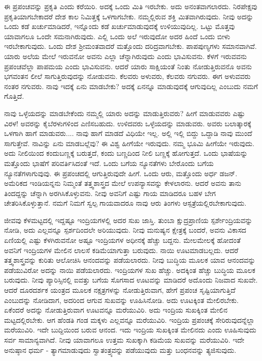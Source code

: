 ಈ ಪ್ರಪಂಚವನ್ನು ಪ್ರಕೃತಿ ಎಂದು ಕರೆಯಿರಿ. ಅದಕ್ಕೆ ಒಂದು ಮಿತಿ ಇರಬೇಕು. ಅದು ಅನಂತವಾಗಲಾರದು. ನಿರಪೇಕ್ಷವು ಪ್ರಕೃತಿಯಾಗಬೇಕಾದರೆ ದೇಶ ಕಾಲ ನಿಮಿತ್ತಕ್ಕೆ ಒಳಗಾಗಬೇಕು. ನಮ್ಮಲ್ಲಿರುವ ಶಕ್ತಿ ಮಿತವಾಗಿರುವುದು. ನೀವು ಅದನ್ನು ಒಂದು ಕಡೆ ಖರ್ಚುಮಾಡಿದರೆ, ಇನ್ನೊಂದು ಕಡೆ ಖರ್ಚುಮಾಡುವುದಕ್ಕೆ ಉಳಿಯುವುದಿಲ್ಲ. ಒಟ್ಟು ಮೊತ್ತವು ಯಾವಾಗಲೂ ಒಂದೇ ಸಮನಾಗಿರುವುದು. ಎಲ್ಲಿ ಒಂದು ಅಲೆ ಇರುವುದೋ ಅದರ ಹಿಂದೆ ಒಂದು ಬೀಳು ಇರಬೇಕಾಗುವುದು. ಒಂದು ದೇಶ ಶ‍್ರೀಮಂತವಾದರೆ ಮತ್ತೊಂದು ದರಿದ್ರವಾಗಬೇಕು. ಪಾಪಪುಣ್ಯಗಳು ಸಮಾನವಾಗಿವೆ. ಯಾರು ಅಲೆಯ ಮೇಲೆ ಇರುವನೋ ಅವನು ಎಲ್ಲಾ ಚೆನ್ನಾಗಿರುವುದು ಎಂದು ಭಾವಿಸುವನು. ಕೆಳಗೆ ಇರುವವನು ಪ್ರಪಂಚವೆಲ್ಲಾ ಪಾಪಮಯ ಎಂದು ಭಾವಿಸುವನು. ಆದರೆ ಯಾರು ಸಾಕ್ಷಿಯಂತೆ ನಿಂತು ನೋಡುತ್ತಿರುವನೊ ಅವನು ಭಗವಂತನ ಲೀಲೆ ಸಾಗುತ್ತಿರುವುದನ್ನು ನೋಡುವನು. ಕೆಲವರು ಅಳುವರು, ಕೆಲವರು ನಗುವರು. ಈಗ ಅಳುವವರು ನಂತರ ನಗುವರು. ನಾವು ಇದಕ್ಕೆ ಏನು ಮಾಡಬೇಕು? ಅದಕ್ಕೆ ಏನನ್ನೂ ಮಾಡುವುದಕ್ಕೆ ಆಗುವುದಿಲ್ಲ ಎಂಬುದು ನಮಗೆ ಗೊತ್ತಿದೆ.

ನಾವು ಒಳ್ಳೆಯದನ್ನು ಮಾಡಬೇಕೆಂದು ನಮ್ಮಲ್ಲಿ ಯಾರು ಅದನ್ನು ಮಾಡುತ್ತಿರುವರು? ಹೀಗೆ ಮಾಡುವವರು ಎಷ್ಟು ವಿರಳ! ಅವರನ್ನು ಕೈಬೆರಳುಗಳಿಂದ ಎಣಿಸಬಹುದು. ಉಳಿದವರು ಒಳ್ಳೆಯದನ್ನು ಮಾಡುವರು. ಅವರು ಬಲಾತ್ಕಾರಕ್ಕೆ ಒಳಗಾಗಿ ಹಾಗೆ ಮಾಡುವರು.... ನಾವು ಹಾಗೆ ಮಾಡದೆ ವಿಧಿಯೇ ಇಲ್ಲ. ಅಲ್ಲಿ ಇಲ್ಲಿ ಬಿದ್ದು ಒದ್ದಾಡಿ ನಾವು ಮುಂದೆ ಸಾಗುತ್ತೇವೆ. ನಾವಿನ್ನು ಏನು ಮಾಡಬಲ್ಲೆವು? ಈ ವಿಶ್ವ ಹೀಗೆಯೇ ಇರುವುದು. ನಮ್ಮ ಭೂಮಿ ಹೀಗೆಯೇ ಇರುವುದು. ಅದು ನೀಲಿಯಿಂದ ಕಂದುಬಣ್ಣಕ್ಕೆ ಬರುತ್ತದೆ, ಕಂದು ಬಣ್ಣದಿಂದ ನೀಲಿ ಬಣ್ಣಕ್ಕೆ ಹೋಗುತ್ತದೆ. ಒಂದು ಭಾಷೆಯನ್ನು ಮತ್ತೊಂದು ಭಾಷೆಗೆ ಪರಿವರ್ತಿಸಿದಂತೆ ಇದೆ. ಒಂದು ಬಗೆಯ ನ್ಯೂನತೆಗಳು ಬೇರೊಂದು ಬಗೆಯ ನ್ಯೂನತೆಗಳಾಗುವುವು. ಈ ಪ್ರಪಂಚದಲ್ಲಿ ಆಗುತ್ತಿರುವುದೇ ಹೀಗೆ. ಒಂದು ಆರು, ಮತ್ತೊಂದು ಅರ್ಧ ಡಜನ್. ಅಮೆರಿಕದ ಇಂಡಿಯನ್ನನು ನಿಮ್ಮಂತೆ ತತ್ತ್ವಶಾಸ್ತ್ರದ ಮೇಲೆ ಉಪನ್ಯಾಸವನ್ನು ಕೇಳಲಾರನು. ಆದರೆ ಅವನು ತಾನು ತಿಂದದ್ದನ್ನು ಚೆನ್ನಾಗಿ ಅರಗಿಸಿಕೊಳ್ಳುವನು. ನೀವು ಅವನಿಗೆ ಎಷ್ಟು ಗಾಯ ಮಾಡಿದರೂ ಬಹಳ ಬೇಗ ಚೇತರಿಸಿಕೊಳ್ಳುತ್ತಾನೆ. ನಮಗೆ ನಿಮಗೆ ಸ್ವಲ್ಪ ಗಾಯವಾದರೂ ನಾವು ಆರು ತಿಂಗಳು ಆಸ್ಪತ್ರೆಯಲ್ಲಿರಬೇಕಾಗುವುದು.

ಜೀವವು ಕೆಳಮಟ್ಟದಲ್ಲಿ ಇದ್ದಷ್ಟೂ ಇಂದ್ರಿಯಗಳಲ್ಲಿ ಅದರ ಸುಖ ಜಾಸ್ತಿ. ತುಂಬಾ ಕ್ಷುದ್ರಪ್ರಾಣಿಯ ಸ್ಪರ್ಶೇಂದ್ರಿಯವನ್ನು ನೋಡಿ, ಅದು ಎಲ್ಲವನ್ನೂ ಸ್ಪರ್ಶದಿಂದಲೇ ಅರಿಯುವುದು. ನೀವು ಮನುಷ್ಯನ ಕ್ಷೇತ್ರಕ್ಕೆ ಬಂದರೆ, ಅವನು ವಿಕಾಸದ ಏಣಿಯಲ್ಲಿ ಎಷ್ಟು ಕೆಳಗಿರುವನೋ ಅಷ್ಟೂ ಇಂದ್ರಿಯಗಳ ಅಧೀನಕ್ಕೆ ಹೆಚ್ಚು ಬದ್ದನು. ಮೇಲಮೇಲಕ್ಕೆ ಹೋದಂತೆ ಅವನಿಗೆ ಇಂದ್ರಿಯಗಳ ಮೇಲಿನ ಲಾಲಸೆ ಕಡಿಮೆಯಾಗುತ್ತಾ ಬರುವುದು. ನಾಯಿ ಊಟಮಾಡಬಲ್ಲದು. ಆದರೆ ತತ್ತ್ವಶಾಸ್ತ್ರವನ್ನು ಕುರಿತು ಆಲೋಚಿಸಿ ಆನಂದವನ್ನು ಪಡೆಯಲಾರದು. ನೀವು ಬುದ್ಧಿಯ ಮೂಲಕ ಯಾವ ಆನಂದವನ್ನು ಪಡೆಯುವಿರೋ ಅದನ್ನು ನಾಯಿ ಪಡೆಯಲಾರದು. ಇಂದ್ರಿಯಗಳ ಸುಖ ಹೆಚ್ಚು. ಅದಕ್ಕಿಂತ ಹೆಚ್ಚು ಬುದ್ಧಿಯ ಮೂಲಕ ಬರುವುದು. ನೀವು ಪ್ಯಾರಿಸ್ಸಿನಲ್ಲಿ ಐವತ್ತು ಬಗೆಯ ಸೊಗಸಾದ ಊಟವನ್ನು ಮಾಡಿದರೆ ಅದೊಂದು ನಿಜವಾದ ಸುಖವೇ. ಆದರೆ ದೂರದರ್ಶಕ ಯಂತ್ರದ ಮೂಲಕ ನಕ್ಷತ್ರಗಳನ್ನು ನೋಡುತ್ತಿರುವಾಗ, ಹೇಗೆ ಪ್ರಪಂಚ ಸೃಷ್ಟಿಯಾಗುತ್ತಿದೆ ಎಂಬುದನ್ನು ನೋಡಿದಾಗ, ಅದರಿಂದ ಆಗುವ ಸುಖವನ್ನು ಊಹಿಸಿನೋಡಿ. ಅದು ಊಟಕ್ಕಿಂತ ಮೇಲಿರಬೇಕು. ಏಕೆಂದರೆ ಅದನ್ನು ನೋಡುತ್ತಿರುವಾಗ ಊಟವನ್ನೂ ಮರೆಯುವಿರಿ. ಅದು ಇಂದ್ರಿಯ ಸುಖಕ್ಕಿಂತ ಮೇಲಿನ ಮಟ್ಟದಲ್ಲಿರಬೇಕು. ಆಗ ಹೆಂಡತಿ ಗಂಡ ಮಕ್ಕಳು ಎಲ್ಲವನ್ನೂ ಮರೆಯುವಿರಿ. ಇಂದ್ರಿಯ ಪ್ರಪಂಚಕ್ಕೆ ಸೇರಿರುವುದನ್ನೆಲ್ಲಾ ಮರೆಯುವಿರಿ. ಇದೇ ಬುದ್ದಿಯಿಂದ ಬರುವ ಆನಂದ. ಇದು ಇಂದ್ರಿಯ ಸುಖಕ್ಕಿಂತ ಮೇಲಿನದು ಎಂದು ಊಹಿಸುವುದು ಸರ್ವ ಸಾಮಾನ್ಯವಾಗಿದೆ. ನೀವು ಯಾವಾಗಲೂ ಉತ್ತಮ ಸುಖಕ್ಕಾಗಿ ಕಡಿಮೆಯ ಸುಖವನ್ನು ಮರೆಯುವಿರಿ. ಇದೇ ಅನುಷ್ಠಾನ ಧರ್ಮ - ತ್ಯಾಗಮಾಡುವುದು ಸ್ವಾತಂತ್ರ್ಯವನ್ನು ಪಡೆಯುವುದು ಮತ್ತು ಬಂಧನವನ್ನು ತ್ಯಜಿಸುವುದು.

